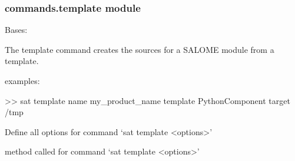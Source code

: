 \documentclass[a4paper,10pt,english]{sphinxmanual}
\begin{document}
\subsubsection{commands.template module}
\label{\detokenize{apidoc_commands/commands:module-commands.template}}\label{\detokenize{apidoc_commands/commands:commands-template-module}}

\begin{fulllineitems}
\label{\detokenize{apidoc_commands/commands:commands.template.Command}}
Bases: 

The template command creates the sources for a SALOME module from a template.

\begin{DUlineblock}{0em}
\item[] examples:
\item[] \textgreater{}\textgreater{} sat template \textendash{}name my\_product\_name \textendash{}template PythonComponent \textendash{}target /tmp
\end{DUlineblock}

\begin{fulllineitems}
\label{\detokenize{apidoc_commands/commands:commands.template.Command.getParser}}
Define all options for command ‘sat template \textless{}options\textgreater{}’

\end{fulllineitems}


\begin{fulllineitems}
\label{\detokenize{apidoc_commands/commands:commands.template.Command.name}}
\end{fulllineitems}


\begin{fulllineitems}
\label{\detokenize{apidoc_commands/commands:commands.template.Command.run}}
method called for command ‘sat template \textless{}options\textgreater{}’

\end{fulllineitems}


\end{fulllineitems}
\end{document}
